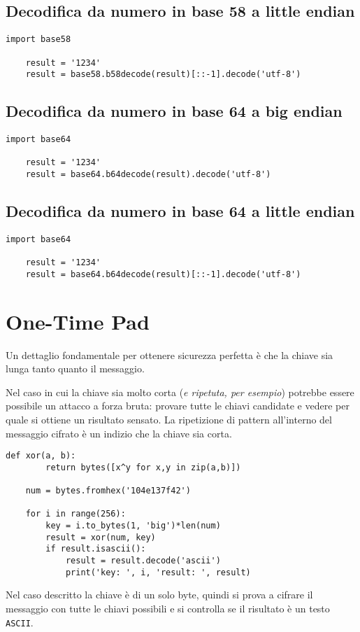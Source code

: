 \subsection{Decodifica da numero in base 58 a little endian}
\begin{lstlisting}[style=pythonStyle]
    import base58

    result = '1234'
    result = base58.b58decode(result)[::-1].decode('utf-8')
\end{lstlisting}
\subsection{Decodifica da numero in base 64 a big endian}
\begin{lstlisting}[style=pythonStyle]
    import base64

    result = '1234'
    result = base64.b64decode(result).decode('utf-8')
\end{lstlisting}
\subsection{Decodifica da numero in base 64 a little endian}
\begin{lstlisting}[style=pythonStyle]
    import base64

    result = '1234'
    result = base64.b64decode(result)[::-1].decode('utf-8')
\end{lstlisting}
\section{One-Time Pad}
Un dettaglio fondamentale per ottenere sicurezza perfetta è che la chiave sia lunga tanto quanto il messaggio.

Nel caso in cui la chiave sia molto corta (\textit{e ripetuta, per esempio})
potrebbe essere possibile un attacco a forza bruta: provare tutte le chiavi
candidate e vedere per quale si ottiene un risultato sensato.
La ripetizione di pattern all'interno del messaggio cifrato è un indizio
che la chiave sia corta.
\begin{lstlisting}[style=pythonStyle]
    def xor(a, b):
        return bytes([x^y for x,y in zip(a,b)])

    num = bytes.fromhex('104e137f42')

    for i in range(256):
        key = i.to_bytes(1, 'big')*len(num)
        result = xor(num, key)
        if result.isascii():
            result = result.decode('ascii')
            print('key: ', i, 'result: ', result)

\end{lstlisting}
Nel caso descritto la chiave è di un solo byte, quindi si prova a cifrare
il messaggio con tutte le chiavi possibili e si controlla se il risultato
è un testo \texttt{ASCII}.
